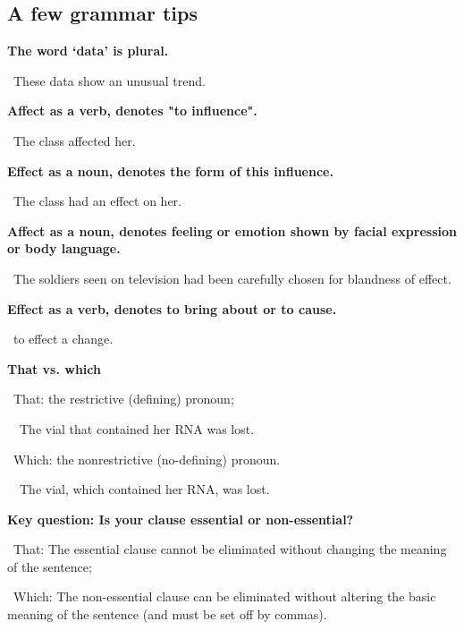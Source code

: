 \documentclass[a4paper, 12pt]{article}
\begin{document}
\newpage\subsection{A few grammar tips}

\textbf{The word `data' is plural.}
\par\textbullet\ These data show an unusual trend.

\textbf{Affect as a verb, denotes "to influence".}
\par\textbullet\ The class affected her.

\textbf{Effect as a noun, denotes the form of this influence.}
\par\textbullet\ The class had an effect on her.

\textbf{Affect as a noun, denotes feeling or emotion shown by facial expression or body language.}
\par\textbullet\ The soldiers seen on television had been carefully chosen for blandness of effect.

\textbf{Effect as a verb, denotes to bring about or to cause.}
\par\textbullet\ to effect a change.

\textbf{That vs. which}
\par\textbullet\ That: the restrictive (defining) pronoun;
\par\ \textopenbullet\ The vial that contained her RNA was lost.
\par\textbullet\ Which: the nonrestrictive (no-defining) pronoun.
\par\ \textopenbullet\ The vial, which contained her RNA, was lost.

\textbf{Key question: Is your clause essential or non-essential?}
\par\textbullet\ That: The essential clause cannot be eliminated without changing the meaning of the sentence;
\par\textbullet\ Which: The non-essential clause can be eliminated without altering the basic meaning of the sentence (and must be set off by commas).
\end{document}
